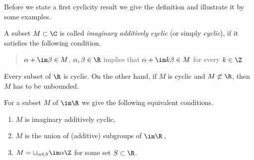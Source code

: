 Before we state a first cyclicity result we give the definition and illustrate it by some examples.
\begin{definition}\label{def:b3-2.5}

A subset $M \subset \C$ is called \emph{imaginary additively cyclic} 
(or simply \emph{cyclic}), if it satisfies the following condition. 
\begin{quote}
$\alpha + \im\beta \in M$, $\alpha,\beta \in \R$ implies that $\alpha +  \im k\beta \in M$ for every $k \in \Z$\,
\end{quote}
\end{definition}
Every subset of\/ $\R$ is cyclic. 
On the other hand, if\/ $M$ is cyclic and $M \not\subset \R$, then $M$ has to be unbounded.
	
For a subset $M$ of\/ $\im \R$ we give the following equivalent conditions.
	\begin{enumerate}[\upshape (a)]
		\item 
		$M$ is imaginary additively cyclic,
		
		\item 
		$M$ is the union of (additive) subgroups of\/ $\im \R$\,,
		
		\item 
		$M = \cup_{\alpha \in S} \im\alpha\Z$ for some set $S \subset \R$.
	\end{enumerate}
	
